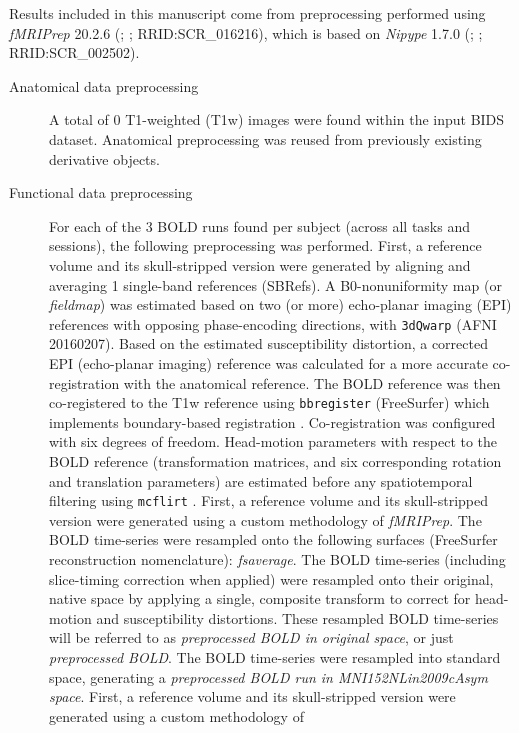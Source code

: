 \documentclass[]{article}
\date{}
\begin{document}
Results included in this manuscript come from preprocessing performed
using \emph{fMRIPrep} 20.2.6 (\citet{fmriprep1}; \citet{fmriprep2};
RRID:SCR\_016216), which is based on \emph{Nipype} 1.7.0
(\citet{nipype1}; \citet{nipype2}; RRID:SCR\_002502).

\begin{description}
\item[Anatomical data preprocessing]
A total of 0 T1-weighted (T1w) images were found within the input BIDS
dataset. Anatomical preprocessing was reused from previously existing
derivative objects.
\item[Functional data preprocessing]
For each of the 3 BOLD runs found per subject (across all tasks and
sessions), the following preprocessing was performed. First, a reference
volume and its skull-stripped version were generated by aligning and
averaging 1 single-band references (SBRefs). A B0-nonuniformity map (or
\emph{fieldmap}) was estimated based on two (or more) echo-planar
imaging (EPI) references with opposing phase-encoding directions, with
\texttt{3dQwarp} \citet{afni} (AFNI 20160207). Based on the estimated
susceptibility distortion, a corrected EPI (echo-planar imaging)
reference was calculated for a more accurate co-registration with the
anatomical reference. The BOLD reference was then co-registered to the
T1w reference using \texttt{bbregister} (FreeSurfer) which implements
boundary-based registration \citep{bbr}. Co-registration was configured
with six degrees of freedom. Head-motion parameters with respect to the
BOLD reference (transformation matrices, and six corresponding rotation
and translation parameters) are estimated before any spatiotemporal
filtering using \texttt{mcflirt} \citep[FSL 5.0.9,][]{mcflirt}. First, a
reference volume and its skull-stripped version were generated using a
custom methodology of \emph{fMRIPrep}. The BOLD time-series were
resampled onto the following surfaces (FreeSurfer reconstruction
nomenclature): \emph{fsaverage}. The BOLD time-series (including
slice-timing correction when applied) were resampled onto their
original, native space by applying a single, composite transform to
correct for head-motion and susceptibility distortions. These resampled
BOLD time-series will be referred to as \emph{preprocessed BOLD in
original space}, or just \emph{preprocessed BOLD}. The BOLD time-series
were resampled into standard space, generating a \emph{preprocessed BOLD
run in MNI152NLin2009cAsym space}. First, a reference volume and its
skull-stripped version were generated using a custom methodology of

\end{description}
\end{document}
